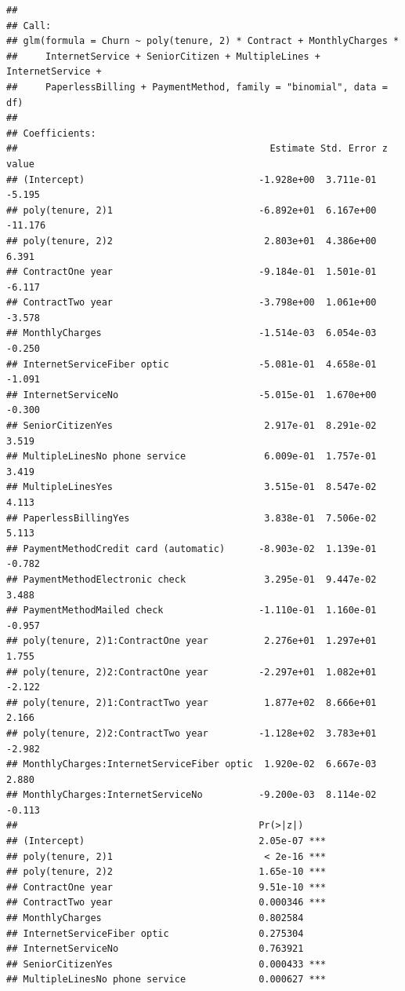 \documentclass[
]{article}
\begin{document}
\begin{verbatim}
## 
## Call:
## glm(formula = Churn ~ poly(tenure, 2) * Contract + MonthlyCharges * 
##     InternetService + SeniorCitizen + MultipleLines + InternetService + 
##     PaperlessBilling + PaymentMethod, family = "binomial", data = df)
## 
## Coefficients:
##                                             Estimate Std. Error z value
## (Intercept)                               -1.928e+00  3.711e-01  -5.195
## poly(tenure, 2)1                          -6.892e+01  6.167e+00 -11.176
## poly(tenure, 2)2                           2.803e+01  4.386e+00   6.391
## ContractOne year                          -9.184e-01  1.501e-01  -6.117
## ContractTwo year                          -3.798e+00  1.061e+00  -3.578
## MonthlyCharges                            -1.514e-03  6.054e-03  -0.250
## InternetServiceFiber optic                -5.081e-01  4.658e-01  -1.091
## InternetServiceNo                         -5.015e-01  1.670e+00  -0.300
## SeniorCitizenYes                           2.917e-01  8.291e-02   3.519
## MultipleLinesNo phone service              6.009e-01  1.757e-01   3.419
## MultipleLinesYes                           3.515e-01  8.547e-02   4.113
## PaperlessBillingYes                        3.838e-01  7.506e-02   5.113
## PaymentMethodCredit card (automatic)      -8.903e-02  1.139e-01  -0.782
## PaymentMethodElectronic check              3.295e-01  9.447e-02   3.488
## PaymentMethodMailed check                 -1.110e-01  1.160e-01  -0.957
## poly(tenure, 2)1:ContractOne year          2.276e+01  1.297e+01   1.755
## poly(tenure, 2)2:ContractOne year         -2.297e+01  1.082e+01  -2.122
## poly(tenure, 2)1:ContractTwo year          1.877e+02  8.666e+01   2.166
## poly(tenure, 2)2:ContractTwo year         -1.128e+02  3.783e+01  -2.982
## MonthlyCharges:InternetServiceFiber optic  1.920e-02  6.667e-03   2.880
## MonthlyCharges:InternetServiceNo          -9.200e-03  8.114e-02  -0.113
##                                           Pr(>|z|)    
## (Intercept)                               2.05e-07 ***
## poly(tenure, 2)1                           < 2e-16 ***
## poly(tenure, 2)2                          1.65e-10 ***
## ContractOne year                          9.51e-10 ***
## ContractTwo year                          0.000346 ***
## MonthlyCharges                            0.802584    
## InternetServiceFiber optic                0.275304    
## InternetServiceNo                         0.763921    
## SeniorCitizenYes                          0.000433 ***
## MultipleLinesNo phone service             0.000627 ***

\end{verbatim}
\end{document}
